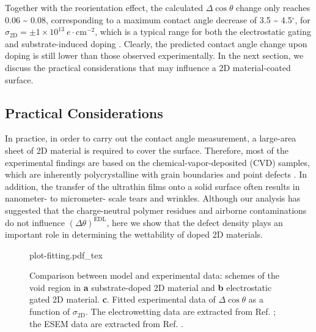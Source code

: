 Together with the reorientation effect, the calculated \(\Delta \cos
\theta\) change only reaches 0.06 \textasciitilde{} 0.08, corresponding to a maximum
contact angle decrease of 3.5 \textasciitilde{} 4.5\(^{\circ}\), for
\(\sigma_{\mathrm{2D}}=\pm1\times10^{13}\ e\cdot \mathrm{cm}^{-2}\),
which is a typical range for both the electrostatic gating
\autocite{Hong_2016_mechanism} and substrate-induced doping
\autocite{Ashraf_2016_doping}. Clearly, the predicted contact angle
change upon doping is still lower than those observed
experimentally. In the next section, we discuss the practical
considerations that may influence a 2D material-coated surface.


\subsection{Practical Considerations}
\label{sec:orgb997597}

In practice, in order to
carry out the contact angle measurement, a large-area sheet of 2D
material is required to cover the surface. Therefore, most of the
experimental findings are based on the chemical-vapor-deposited (CVD)
samples, which are inherently polycrystalline with grain boundaries
and point defects \autocite{Banhart_2011_defect}.  In addition, the transfer
of the ultrathin films onto a solid surface often results in
nanometer- to micrometer- scale tears and wrinkles. Although our
analysis has suggested that the charge-neutral polymer residues and
airborne contaminations do not influence \((\Delta
\theta)^{\mathrm{EDL}}\), here we show that the defect density plays an
important role in determining the wettability of doped 2D
materials.

\begin{figure}[!htbp]
  \centering
  {plot-fitting.pdf_tex}
  \caption{\label{fig:wet-f-nc-exp} Comparison between model and
    experimental data: schemes of the void region in \textbf{a}
    substrate-doped 2D material and \textbf{b} electrostatic gated 2D
    material. \textbf{c}. Fitted experimental data of
    \(\Delta\cos\theta\) as a function of
    \(\sigma_{\mathrm{2D}}\). The electrowetting data are extracted
    from Ref. \cite{Hong_2016_mechanism}; the ESEM data are extracted
    from Ref. \cite{Ashraf_2016_doping}.}
\end{figure}

